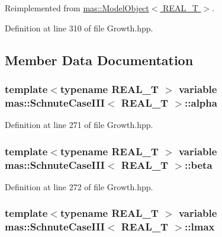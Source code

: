 Reimplemented from \hyperlink{structmas_1_1_model_object_a8eaf6c7c52e42ea8869aefa318358cb5}{mas\-::\-Model\-Object$<$ R\-E\-A\-L\-\_\-\-T $>$}.



Definition at line 310 of file Growth.\-hpp.



\subsection{Member Data Documentation}
\hypertarget{structmas_1_1_schnute_case_i_i_i_a327d0f288525e7f5c531876245728dcf}{
\subsubsection[{alpha}]{\setlength{\rightskip}{0pt plus 5cm}template$<$typename R\-E\-A\-L\-\_\-\-T $>$ {\bf variable} {\bf mas\-::\-Schnute\-Case\-I\-I\-I}$<$ R\-E\-A\-L\-\_\-\-T $>$\-::alpha}}\label{structmas_1_1_schnute_case_i_i_i_a327d0f288525e7f5c531876245728dcf}


Definition at line 271 of file Growth.\-hpp.

\hypertarget{structmas_1_1_schnute_case_i_i_i_a857518ba684261d8b0a7bdd08e2c48c3}{
\subsubsection[{beta}]{\setlength{\rightskip}{0pt plus 5cm}template$<$typename R\-E\-A\-L\-\_\-\-T $>$ {\bf variable} {\bf mas\-::\-Schnute\-Case\-I\-I\-I}$<$ R\-E\-A\-L\-\_\-\-T $>$\-::beta}}\label{structmas_1_1_schnute_case_i_i_i_a857518ba684261d8b0a7bdd08e2c48c3}


Definition at line 272 of file Growth.\-hpp.

\hypertarget{structmas_1_1_schnute_case_i_i_i_a4129bd8069255252549453d2ec3fefb7}{
\subsubsection[{lmax}]{\setlength{\rightskip}{0pt plus 5cm}template$<$typename R\-E\-A\-L\-\_\-\-T $>$ {\bf variable} {\bf mas\-::\-Schnute\-Case\-I\-I\-I}$<$ R\-E\-A\-L\-\_\-\-T $>$\-::lmax}}\label{structmas_1_1_schnute_case_i_i_i_a4129bd8069255252549453d2ec3fefb7}


